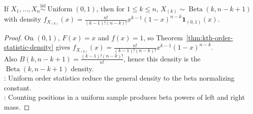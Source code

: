 \begin{corollary} \label{cor:uniform-order-statistics-are-beta} \\
If $X_1,\ldots,X_n\overset{\mathrm{iid}}{\sim}\operatorname{Uniform}(0,1)$, then for $1\leq k\leq n$, $X_{(k)}\sim\operatorname{Beta}(k,n-k+1)$\\
with density $f_{X_{(k)}}(x)=\frac{n!}{(k-1)!(n-k)!}x^{k-1}(1-x)^{n-k}\mathbf{1}_{(0,1)}(x)$.
\begin{proof}
On $(0,1)$, $F(x)=x$ and $f(x)=1$, so Theorem~\ref{thm:kth-order-statistic-density} gives $f_{X_{(k)}}(x)=\frac{n!}{(k-1)!(n-k)!}x^{k-1}(1-x)^{n-k}$.\\
Also $B(k,n-k+1)=\frac{(k-1)!(n-k)!}{n!}$, hence this density is the $\operatorname{Beta}(k,n-k+1)$ density.\\
: Uniform order statistics reduce the general density to the beta normalizing constant.\\
: Counting positions in a uniform sample produces beta powers of left and right mass.
\end{proof}
\end{corollary}

